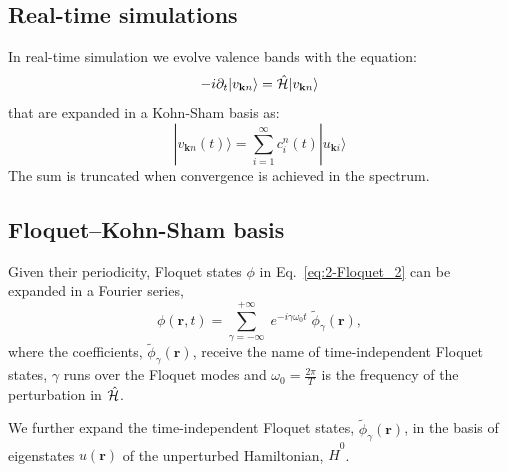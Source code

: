 \documentclass[aps,physrev,preprint,groupedaddress]{revtex4-2}
\newcommand{\tdKS}{|v_{\mathbf{k}n}\rangle}
\renewcommand{\[}{\left[}
\renewcommand{\]}{\right]}
\renewcommand{\(}{\left(}
\renewcommand{\)}{\right)}
\begin{document}
\subsection{\label{sec:realtime} Real-time simulations}
In real-time simulation we evolve valence bands with the equation:
\begin{equation}\label{eq:EOM}
    - i \partial_t  \tdKS =\hat{\cal H} \tdKS
\end{equation}
that are expanded in a Kohn-Sham basis as:
\begin{equation}
	|v_{\mathbf{k}n}(t)\rangle = \sum_{i=1}^{\infty} c_i^n(t) |u_{\mathbf{k}i}\rangle
\end{equation}
The sum is truncated when convergence is achieved in the spectrum.

\subsection{\label{sec:FloqKS} Floquet--Kohn-Sham basis}
Given their periodicity, Floquet states $\phi$ in Eq.~\ref{eq:2-Floquet_2} can be expanded in a Fourier series,
\begin{equation}\label{eq:2-Floquet_3}
    \phi(\mathbf{r},t) = \sum_{\gamma=-\infty}^{+\infty}{\;e^{-i\gamma\omega_0t}\;\widetilde\phi_\gamma(\mathbf{r})},
\end{equation}
where the coefficients, $\widetilde\phi_\gamma(\mathbf{r})$, receive the name of time-independent Floquet states, $\gamma$ runs over the Floquet modes and $\omega_0=\frac{2\pi}{T}$ is the frequency of the perturbation in $\hat{\cal H}$. 


We further expand the time-independent Floquet states, $\widetilde\phi_\gamma(\mathbf{r})$, in the basis of eigenstates $u(\mathbf{r})$ of the unperturbed Hamiltonian, $\hat H^0$. 
\end{document}

